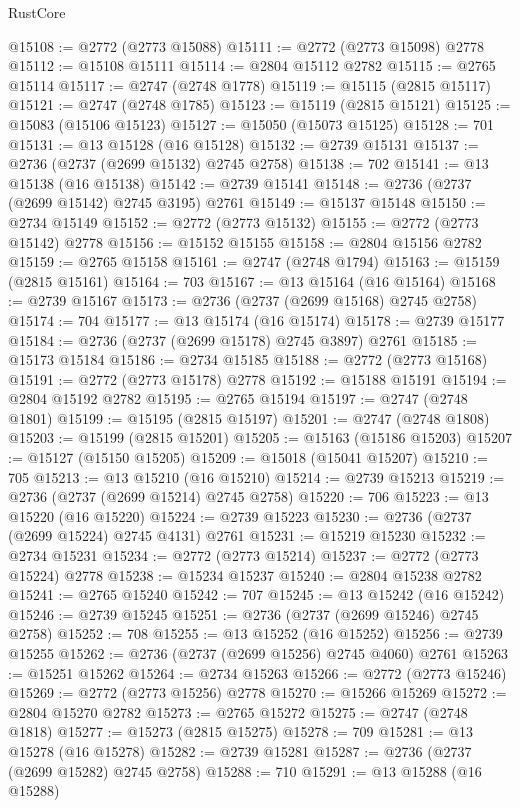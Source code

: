 \begin{lexlean}{RustCore}
\begin{coremodule}
@15108 := @2772 (@2773 @15088)
@15111 := @2772 (@2773 @15098) @2778
@15112 := @15108 @15111
@15114 := @2804 @15112 @2782
@15115 := @2765 @15114
@15117 := @2747 (@2748 @1778)
@15119 := @15115 (@2815 @15117)
@15121 := @2747 (@2748 @1785)
@15123 := @15119 (@2815 @15121)
@15125 := @15083 (@15106 @15123)
@15127 := @15050 (@15073 @15125)
@15128 := 701
@15131 := @13 @15128 (@16 @15128)
@15132 := @2739 @15131
@15137 := @2736 (@2737 (@2699 @15132) @2745 @2758)
@15138 := 702
@15141 := @13 @15138 (@16 @15138)
@15142 := @2739 @15141
@15148 := @2736 (@2737 (@2699 @15142) @2745 @3195) @2761
@15149 := @15137 @15148
@15150 := @2734 @15149
@15152 := @2772 (@2773 @15132)
@15155 := @2772 (@2773 @15142) @2778
@15156 := @15152 @15155
@15158 := @2804 @15156 @2782
@15159 := @2765 @15158
@15161 := @2747 (@2748 @1794)
@15163 := @15159 (@2815 @15161)
@15164 := 703
@15167 := @13 @15164 (@16 @15164)
@15168 := @2739 @15167
@15173 := @2736 (@2737 (@2699 @15168) @2745 @2758)
@15174 := 704
@15177 := @13 @15174 (@16 @15174)
@15178 := @2739 @15177
@15184 := @2736 (@2737 (@2699 @15178) @2745 @3897) @2761
@15185 := @15173 @15184
@15186 := @2734 @15185
@15188 := @2772 (@2773 @15168)
@15191 := @2772 (@2773 @15178) @2778
@15192 := @15188 @15191
@15194 := @2804 @15192 @2782
@15195 := @2765 @15194
@15197 := @2747 (@2748 @1801)
@15199 := @15195 (@2815 @15197)
@15201 := @2747 (@2748 @1808)
@15203 := @15199 (@2815 @15201)
@15205 := @15163 (@15186 @15203)
@15207 := @15127 (@15150 @15205)
@15209 := @15018 (@15041 @15207)
@15210 := 705
@15213 := @13 @15210 (@16 @15210)
@15214 := @2739 @15213
@15219 := @2736 (@2737 (@2699 @15214) @2745 @2758)
@15220 := 706
@15223 := @13 @15220 (@16 @15220)
@15224 := @2739 @15223
@15230 := @2736 (@2737 (@2699 @15224) @2745 @4131) @2761
@15231 := @15219 @15230
@15232 := @2734 @15231
@15234 := @2772 (@2773 @15214)
@15237 := @2772 (@2773 @15224) @2778
@15238 := @15234 @15237
@15240 := @2804 @15238 @2782
@15241 := @2765 @15240
@15242 := 707
@15245 := @13 @15242 (@16 @15242)
@15246 := @2739 @15245
@15251 := @2736 (@2737 (@2699 @15246) @2745 @2758)
@15252 := 708
@15255 := @13 @15252 (@16 @15252)
@15256 := @2739 @15255
@15262 := @2736 (@2737 (@2699 @15256) @2745 @4060) @2761
@15263 := @15251 @15262
@15264 := @2734 @15263
@15266 := @2772 (@2773 @15246)
@15269 := @2772 (@2773 @15256) @2778
@15270 := @15266 @15269
@15272 := @2804 @15270 @2782
@15273 := @2765 @15272
@15275 := @2747 (@2748 @1818)
@15277 := @15273 (@2815 @15275)
@15278 := 709
@15281 := @13 @15278 (@16 @15278)
@15282 := @2739 @15281
@15287 := @2736 (@2737 (@2699 @15282) @2745 @2758)
@15288 := 710
@15291 := @13 @15288 (@16 @15288)

\end{coremodule}
\end{lexlean}
